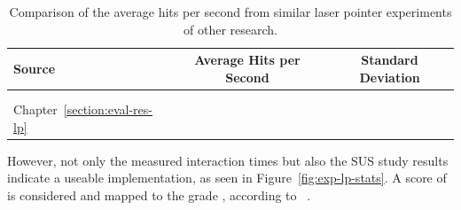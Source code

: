 \begin{table}[H]
	\centering
	\begin{tabular}{l c c}
		\toprule
		Source                            & Average Hits per Second                                                            & Standard Deviation                                                                \\
		\midrule
		\cite{Kamm.2018}                  & \pgfmathparse{\kammAvgHits}\pgfmathprintnumber[fixed, precision=2]{\pgfmathresult} & \pgfmathparse{\kammAvgStd}\pgfmathprintnumber[fixed, precision=2]{\pgfmathresult} \\%
		\cite{JiYoungOh.2002}             & \youngAvgHits{}                                                                    & \youngAvgStd{}                                                                    \\%
		Chapter~\ref{section:eval-res-lp} & \pgfmathparse{\oursAvgHits}\pgfmathprintnumber[fixed, precision=2]{\pgfmathresult} & \pgfmathparse{\oursAvgStd}\pgfmathprintnumber[fixed, precision=2]{\pgfmathresult} \\
		\bottomrule
	\end{tabular}
	\caption[Comparison of laser pointer task results]{Comparison of the average hits per second from similar laser pointer experiments of other research.}\label{tab:lp-comp}
\end{table}

However, not only the measured interaction times but also the \ac{SUS} study results indicate a useable implementation, as seen in Figure~\ref{fig:exp-lp-stats}. A score of \evalExpLpSusScore{} is considered \evalExpLpSusAdj{} and mapped to the grade \evalExpLpSusGrade{}, according to \citeauthor{Bangor.2009}~\cite[120\psq]{Bangor.2009}.

